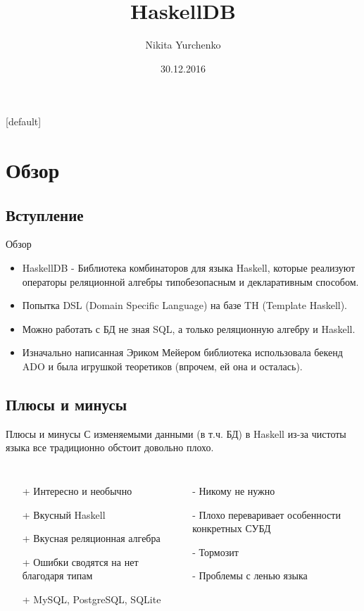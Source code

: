 \documentclass[12pt]{beamer}
\author{Nikita Yurchenko}
\title{HaskellDB}
\institute{National University of Radioelectronics}
\date{30.12.2016}
\makeatletter
\newenvironment{withoutheadline}{
        \setbeamertemplate{headline}[default]
        \def\beamer@entrycode{\vspace*{-\headheight}}
    }{}
\makeatother
\begin{document}
\begin{withoutheadline}
\begin{frame}
\titlepage
\end{frame}

\begin{frame}
\tableofcontents
\end{frame}
\end{withoutheadline}

\section{Обзор}
\subsection{Вступление}
\begin{frame}{Обзор}
\begin{itemize}
\item HaskellDB - Библиотека комбинаторов для языка Haskell, которые реализуют операторы реляционной алгебры типобезопасным и декларативным способом.
\item Попытка DSL (Domain Specific Language) на базе TH (Template Haskell).
\item Можно работать с БД не зная SQL, а только реляционную алгебру и Haskell.
\item Изначально написанная Эриком Мейером библиотека использовала бекенд ADO и была игрушкой теоретиков (впрочем, ей она и осталась).
\end{itemize}
\end{frame}

\subsection{Плюсы и минусы}
\begin{frame}{Плюсы и минусы}
С изменяемыми данными (в т.ч. БД) в Haskell из-за чистоты языка все традиционно обстоит довольно плохо.
\begin{columns}
\begin{itemize}
\item[+] Интересно и необычно
\item[+] Вкусный Haskell
\item[+] Вкусная реляционная алгебра
\item[+] Ошибки сводятся на нет благодаря типам
\item[+] MySQL, PostgreSQL, SQLite
\end{itemize}
\begin{itemize}
\item[-] Никому не нужно
\item[-] Плохо переваривает особенности конкретных СУБД
\item[-] Тормозит
\item[-] Проблемы с ленью языка
\end{itemize}
\end{columns}
\end{frame}
\end{document}
